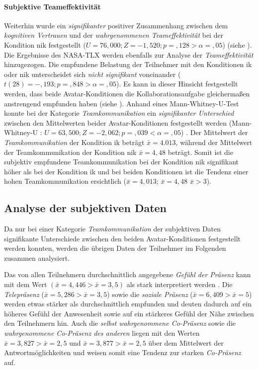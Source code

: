 \documentclass[a4paper,11pt]{article}%
\renewcommand{\\}{\vspace*{0.5\baselineskip} \newline}
\begin{document}
{{\paragraph{Subjektive Teameffektivität}
Weiterhin wurde ein \textit{signifikanter} positiver Zusammenhang zwischen dem \textit{kognitiven Vertrauen} und der \textit{wahrgenommenen Teameffektivität} bei der Kondition \ac{nik} festgestellt ($U = 76,000; Z = -1,520; p =,128 > \alpha = ,05$) (siehe \textit{}).\\
Die Ergebnisse des NASA-TLX werden ebenfalls zur Analyse der \textit{Teameffektivität} hinzugezogen. Die empfundene Belastung der Teilnehmer mit den Konditionen \ac{ik} oder \newline \ac{nik} unterscheidet sich \textit{nicht signifikant} voneinander ($t(28) = -,193; p =,848 > \alpha = ,05$). Es kann in dieser Hinsicht festgestellt werden, dass beide Avatar-Konditionen die Kollaborationsaufgabe gleichermaßen anstrengend empfunden haben (siehe \textit{}).\\
Anhand eines Mann-Whitney-U-Test konnte bei der Kategorie \textit{Teamkommunikation} ein \textit{signifikanter Unterschied} zwischen den Mittelwerten beider Avatar-Konditionen festgestellt werden (Mann-Whitney-U : $U = 63,500; Z = -2,062; p =,039 < \alpha = ,05$) . Der Mittelwert der \textit{Teamkommunikation} der Kondition \ac{ik} beträgt $\bar{x} = 4.013$, während der Mittelwert der Teamkommunikation der Kondition \ac{nik} $\bar{x} = 4,48$ beträgt. Somit ist die subjektiv empfundene Teamkommunikation bei der Kondition \ac{nik} signifikant höher als bei der Kondition \ac{ik} und bei beiden Konditionen ist die Tendenz einer hohen Teamkommunikation ersichtlich ($\bar{x} = 4,013$; $\bar{x} = 4,48$ $ \bar{x} > 3$).\\

\subsection{Analyse der subjektiven Daten}
Da nur bei einer Kategorie \textit{Teamkommunikation} der subjektiven Daten signifikante Unterschiede zwischen den beiden Avatar-Konditionen festgestellt werden konnten, werden die übrigen Daten der Teilnehmer im Folgenden zusammen analysiert.

Das von allen Teilnehmern durchschnittlich angegebene \textit{Gefühl der Präsenz} kann mit dem Wert $(\bar{x} = 4,446 > \bar{x} = 3,5)$ als stark interpretiert werden . Die \textit{Telepräsenz} ($\bar{x} = 5,286 > \bar{x} = 3,5$) sowie die \textit{soziale Präsenz} ($\bar{x} = 6,409 >\bar{x} = 5$) werden etwas stärker als durchschnittlich empfunden und deuten dadurch auf ein höheres Gefühl der Anwesenheit sowie auf ein stärkeres Gefühl der Nähe zwischen den Teilnehmern hin. Auch die \textit{selbst wahrgenommene Co-Präsenz} sowie die \textit{wahrgenommene Co-Präsenz des anderen} liegen mit den Werten $\bar{x} = 3,827 > \bar{x} = 2,5$ und $\bar{x} = 3,877 > \bar{x} = 2,5$ über dem Mittelwert der Antwortmöglichkeiten und weisen somit eine Tendenz zur starken \textit{Co-Präsenz} auf.

}}
\end{document}
